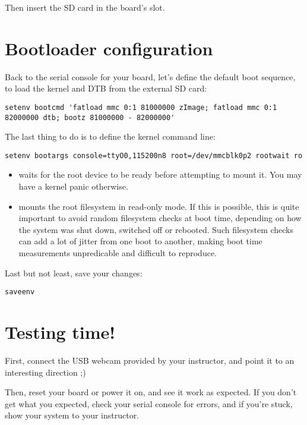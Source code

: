 Then insert the SD card in the board's slot.

\section{Bootloader configuration}

Back to the serial console for your board, let's define the default boot
sequence, to load the kernel and DTB from the external SD card:

{\footnotesize
\begin{verbatim}
setenv bootcmd 'fatload mmc 0:1 81000000 zImage; fatload mmc 0:1 82000000 dtb; bootz 81000000 - 82000000'
\end{verbatim}
}

{\footnotesize
The last thing to do is to define the kernel command line:
\begin{verbatim}
setenv bootargs console=ttyO0,115200n8 root=/dev/mmcblk0p2 rootwait ro
\end{verbatim}
}

\begin{itemize}
\item {} waits for the root device to be ready before
attempting to mount it. You may have a kernel panic otherwise.
\item {} mounts the root filesystem in read-only mode.
If this is possible, this is quite important to avoid random
filesystem checks at boot time, depending on how the system was shut
down, switched off or rebooted. Such filesystem checks can add a lot
of jitter from one boot to another, making boot time measurements
unpredicable and difficult to reproduce.
\end{itemize}

Last but not least, save your changes:
\begin{verbatim}
saveenv
\end{verbatim}

\section{Testing time!}

First, connect the USB webcam provided by your instructor, and point it
to an interesting direction ;)

Then, reset your board or power it on, and see it work as expected. If
you don't get what you expected, check your serial console for errors,
and if you're stuck, show your system to your instructor.
